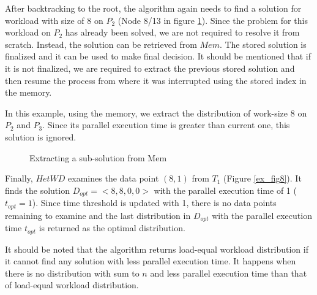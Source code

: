 \documentclass[12pt]{article}
\begin{document}
After backtracking to the root, the algorithm again needs to find a solution for workload with size of 8 on $P_2$ (Node 8/13 in figure \ref{ex_fig7}). Since the problem for this workload on $P_2$ has already been solved, we are not required to resolve it from scratch. Instead, the solution can be retrieved from $Mem$. The stored solution is finalized and it can be used to make final decision. It should be mentioned that if it is not finalized, we are required to extract the previous stored solution and then resume the process from where it was interrupted using the stored index in the memory.

In this example, using the memory, we extract the distribution of work-size 8 on $P_2$ and $P_3$. Since its parallel execution time is greater than current one, this solution is ignored.

\begin{figure}[!t]
	\centering
	\caption{Extracting a sub-solution from Mem}
	\label{ex_fig7}
\end{figure}

Finally, $HetWD$ examines the data point $(8,1)$ from $T_1$ (Figure \ref{ex_fig8}). It finds the solution $D_{opt}=<8,8,0,0>$ with the parallel execution time of 1 ($t_{opt}=1$). Since time threshold is updated with 1, there is no data points remaining to examine and the last distribution in $D_{opt}$ with the parallel execution time $t_{opt}$ is returned as the optimal distribution.

It should be noted that the algorithm returns load-equal workload distribution if it cannot find any solution with less parallel execution time. It happens when there is no distribution with sum to $n$ and less parallel execution time than that of load-equal workload distribution.
\end{document}
